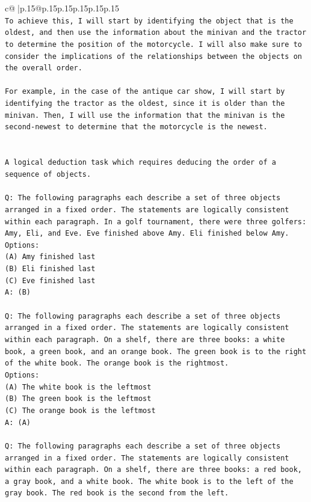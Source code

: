\documentclass{article}
\begin{document}
{\begin{supertabular}{c@{$\;$}|p{.15\linewidth}@{}p{.15\linewidth}p{.15\linewidth}p{.15\linewidth}p{.15\linewidth}p{.15\linewidth}}
{{{\\ 
\texttt{To achieve this, I will start by identifying the object that is the oldest, and then use the information about the minivan and the tractor to determine the position of the motorcycle. I will also make sure to consider the implications of the relationships between the objects on the overall order. } \\
\\ 
\texttt{For example, in the case of the antique car show, I will start by identifying the tractor as the oldest, since it is older than the minivan. Then, I will use the information that the minivan is the second{-}newest to determine that the motorcycle is the newest.} \\
\\ 
\\ 
\texttt{A logical deduction task which requires deducing the order of a sequence of objects.} \\
\\ 
\texttt{Q: The following paragraphs each describe a set of three objects arranged in a fixed order. The statements are logically consistent within each paragraph. In a golf tournament, there were three golfers: Amy, Eli, and Eve. Eve finished above Amy. Eli finished below Amy.} \\
\texttt{Options:} \\
\texttt{(A) Amy finished last} \\
\texttt{(B) Eli finished last} \\
\texttt{(C) Eve finished last} \\
\texttt{A: (B)} \\
\\ 
\texttt{Q: The following paragraphs each describe a set of three objects arranged in a fixed order. The statements are logically consistent within each paragraph. On a shelf, there are three books: a white book, a green book, and an orange book. The green book is to the right of the white book. The orange book is the rightmost.} \\
\texttt{Options:} \\
\texttt{(A) The white book is the leftmost} \\
\texttt{(B) The green book is the leftmost} \\
\texttt{(C) The orange book is the leftmost} \\
\texttt{A: (A)} \\
\\ 
\texttt{Q: The following paragraphs each describe a set of three objects arranged in a fixed order. The statements are logically consistent within each paragraph. On a shelf, there are three books: a red book, a gray book, and a white book. The white book is to the left of the gray book. The red book is the second from the left.} \\
}}}
\end{supertabular}}
\end{document}
